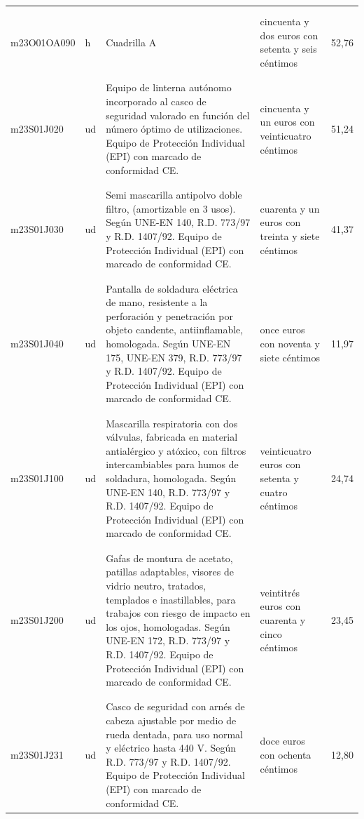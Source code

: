 \begin{supertabular}{|l|l|p{5cm}|p{3cm}|r|}
&&&&\\%
&&&&\\%
m23O01OA090&h&Cuadrilla A&cincuenta y dos euros con setenta y seis céntimos&52,76\\%
&&&&\\%
&&&&\\%
m23S01J020&ud&Equipo de linterna autónomo incorporado al casco de seguridad valorado en función del número óptimo de utilizaciones. Equipo de Protección Individual (EPI) con marcado de conformidad CE.&cincuenta y un euros con veinticuatro céntimos&51,24\\%
&&&&\\%
&&&&\\%
m23S01J030&ud&Semi mascarilla antipolvo doble filtro, (amortizable en 3 usos). Según UNE{-}EN 140, R.D. 773/97 y R.D. 1407/92. Equipo de Protección Individual (EPI) con marcado de conformidad CE.&cuarenta y un euros con treinta y siete céntimos&41,37\\%
&&&&\\%
&&&&\\%
m23S01J040&ud&Pantalla de soldadura eléctrica de mano, resistente a la perforación y penetración por objeto candente, antiinflamable, homologada. Según UNE{-}EN 175, UNE{-}EN 379, R.D. 773/97 y R.D. 1407/92. Equipo de Protección Individual (EPI) con marcado de conformidad CE.&once euros con noventa y siete céntimos&11,97\\%
&&&&\\%
&&&&\\%
m23S01J100&ud&Mascarilla respiratoria con dos válvulas, fabricada en material antialérgico y atóxico, con filtros intercambiables para humos de soldadura, homologada. Según UNE{-}EN 140, R.D. 773/97 y R.D. 1407/92. Equipo de Protección Individual (EPI) con marcado de conformidad CE.&veinticuatro euros con setenta y cuatro céntimos&24,74\\%
&&&&\\%
&&&&\\%
m23S01J200&ud&Gafas de montura de acetato, patillas adaptables, visores de vidrio neutro, tratados, templados e inastillables, para trabajos con riesgo de impacto en los ojos, homologadas. Según UNE{-}EN 172, R.D. 773/97 y R.D. 1407/92. Equipo de Protección Individual (EPI) con marcado de conformidad CE.&veintitrés euros con cuarenta y cinco céntimos&23,45\\%
&&&&\\%
&&&&\\%
m23S01J231&ud&Casco de seguridad con arnés de cabeza ajustable por medio de rueda dentada, para uso normal y eléctrico hasta 440 V. Según R.D. 773/97 y R.D. 1407/92. Equipo de Protección Individual (EPI) con marcado de conformidad CE.&doce euros con ochenta céntimos&12,80\\%

\end{supertabular}
